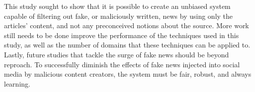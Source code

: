 This study sought to show that it is possible to create an unbiased system capable of filtering out fake, or maliciously written, news by using only the articles' content, and not any preconceived notions about the source.  More work still needs to be done improve the performance of the techniques used in this study, as well as the number of domains that these techniques can be applied to.  Lastly, future studies that tackle the surge of fake news should be beyond reproach.  To successfully diminish the effects of fake news injected into social media by malicious content creators, the system must be fair, robust, and always learning.
